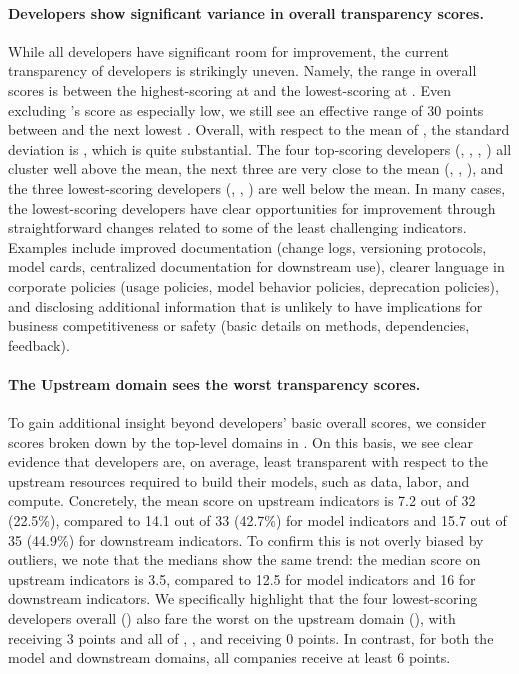 \paragraph{Developers show significant variance in overall transparency scores.}
While all developers have significant room for improvement, the current transparency of developers is strikingly uneven. 
Namely, the range in overall scores is \scorerange between the highest-scoring \meta at \maxscore and the lowest-scoring \amazon at \minscore.
Even excluding \amazon's score as especially low, we still see an effective range of 30 points between \meta and the next lowest \inflection.
Overall, with respect to the mean of \meanscore, the standard deviation is \stdev, which is quite substantial.
The four top-scoring developers (\meta, \huggingface, \openai, \stability) all cluster well above the mean, the next three are very close to the mean (\google, \anthropic, \cohere), and the three lowest-scoring developers (\aitwentyone, \inflection, \amazon) are well below the mean.
In many cases, the lowest-scoring developers have clear opportunities for improvement through straightforward changes related to some of the least challenging indicators. 
Examples include improved documentation  (\eg change logs, versioning protocols, model cards, centralized documentation for downstream use), clearer language in corporate policies  (\eg usage policies, model behavior policies, deprecation policies), and disclosing additional information that is unlikely to have implications for business competitiveness or safety (\eg basic details on methods, dependencies, feedback).

\paragraph{The Upstream domain sees the worst transparency scores.}
To gain additional insight beyond developers' basic overall scores, we consider scores broken down by the \numdomains top-level domains in .
On this basis, we see clear evidence that developers are, on average, least transparent with respect to the upstream resources required to build their models, such as data, labor, and compute. 
Concretely, the mean score on upstream indicators is 7.2 out of 32 (22.5\%), compared to 14.1 out of 33 (42.7\%) for model indicators and 15.7 out of 35 (44.9\%) for downstream indicators.
To confirm this is not overly biased by outliers, we note that the medians show the same trend: the median score on upstream indicators is 3.5, compared to 12.5 for model indicators and 16 for downstream indicators.
We specifically highlight that the four lowest-scoring developers overall () also fare the worst on the upstream domain (), with \cohere receiving 3 points and all of \aitwentyone, \inflection, and \amazon receiving 0 points.
In contrast, for both the model and downstream domains, all \numcompanies companies receive at least 6 points. 


